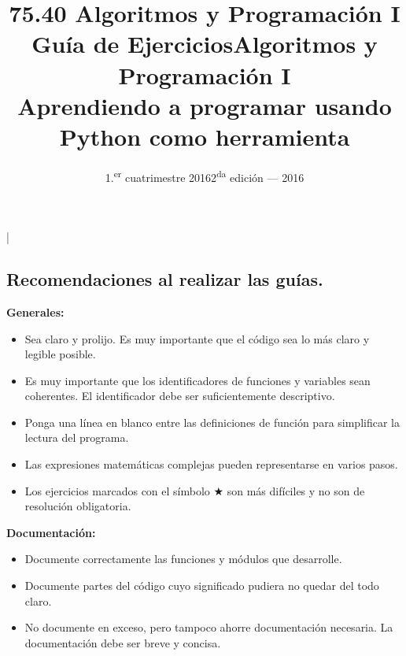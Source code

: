 \documentclass[11pt,spanish,a4paper,twoside,openany]{book}
\title{75.40 Algoritmos y Programación I \\
    \textbf{Guía de Ejercicios}}
\date{1.\textsuperscript{er} cuatrimestre 2016}
\theoremstyle{definition}
\theoremstyle{definition}
\theoremstyle{remark}
\begin{document}
\begin{extract*}
\lstMakeShortInline[style=inlinecode]|
\end{extract*}

\begin{extract} %
\maketitle
\thispagestyle{empty}

\newpage

\section*{Recomendaciones al realizar las guías.}

\textbf{Generales:}
\begin{itemize}
	\item Sea claro y prolijo. Es muy importante que el código sea lo más claro y legible posible.
	\item Es muy importante que los identificadores de funciones y variables sean coherentes. El identificador debe ser suficientemente descriptivo.
	\item Ponga una línea en blanco entre las definiciones de función para simplificar la lectura del programa.
	\item Las expresiones matemáticas complejas pueden representarse en varios pasos.
	\item Los ejercicios marcados con el símbolo $\bigstar$ son más difíciles y no son de resolución obligatoria.
\end{itemize}

\textbf{Documentación:}
\begin{itemize}
	\item Documente correctamente las funciones y módulos que desarrolle.
	\item Documente partes del código cuyo significado pudiera no quedar del todo claro.
	\item No documente en exceso, pero tampoco ahorre documentación necesaria. La documentación debe ser breve y concisa.
\end{itemize}
\end{extract}

\title{{\bf Algoritmos y Programación I} \\ Aprendiendo a programar usando Python como herramienta}
\date{2\textsuperscript{da} edición --- 2016}
\maketitle

\tableofcontents
























\end{document}
